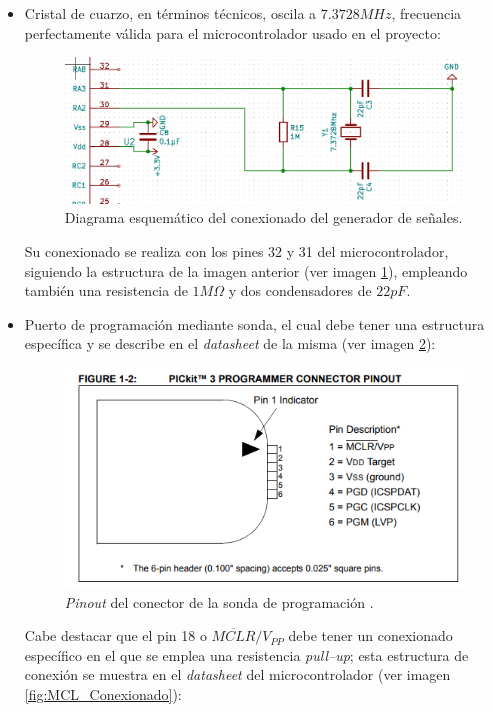 \begin{itemize}
    \item Cristal de cuarzo, en términos técnicos, oscila a $7.3728MHz$, frecuencia perfectamente válida para el microcontrolador usado en el proyecto:
    
    \begin{figure}[H]
    \centering 
    \includegraphics[width=.7\linewidth]{pictures/Cristal.PNG}
    \caption{Diagrama esquemático del conexionado del generador de señales.}
    \label{fig:Cristal}
    \end{figure}
    
    Su conexionado se realiza con los pines 32 y 31 del microcontrolador, siguiendo la estructura de la imagen anterior (ver imagen \ref{fig:Cristal}), empleando también una resistencia de $1 M\Omega$ y dos condensadores de $22 pF$.
    
    \item Puerto de programación mediante sonda, el cual debe tener una estructura específica y se describe en el \textit{datasheet} de la misma (ver imagen \ref{fig:Sonda_Conexionado}):
    
    \begin{figure}[H]
    \centering 
    \includegraphics[width=.5\linewidth]{pictures/Sonda.PNG}
    \caption{\textit{Pinout} del conector de la sonda de programación \cite{DsPIC33EP512GM60416BitMicrocontrollers}.}
    \label{fig:Sonda_Conexionado}
    \end{figure}
    
     Cabe destacar que el pin 18 o $\overline{MCLR}/V_{PP}$ debe tener un conexionado específico en el que se emplea una resistencia \textit{pull--up}; esta estructura de conexión se muestra en el \textit{datasheet} del microcontrolador (ver imagen \ref{fig:MCL_Conexionado}):
     

\end{itemize}
